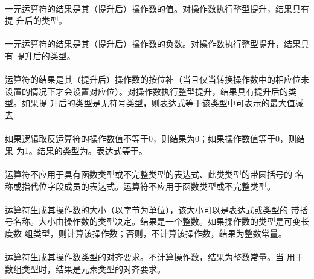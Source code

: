 {\semantic
\paragraph{}
一元\tm{+}运算符的结果是其（提升后）操作数的值。对操作数执行整型提升，结果具有提
升后的类型。

\paragraph{}
一元\tm{-}运算符的结果是其（提升后）操作数的负数。对操作数执行整型提升，结果具有
提升后的类型。

\paragraph{}
\tm{\~}运算符的结果是其（提升后）操作数的按位补（当且仅当转换操作数中的相应位未
设置的情况下才会设置对应位）。对操作数执行整型提升，结果具有提升后的类型。如果提
升后的类型是无符号类型，则表达式等于该类型中可表示的最大值减去.

\paragraph{}
如果逻辑取反运算符\tm{!}的操作数值不等于0，则结果为0；如果操作数值等于0，则结果
为1。结果的类型为。表达式等于。

\constraint
\paragraph{}
运算符不应用于具有函数类型或不完整类型的表达式、此类类型的带圆括号的
名称或指代位字段成员的表达式。运算符不应用于函数类型或不完整类型。

\semantic
\paragraph{}
运算符生成其操作数的大小（以字节为单位），该大小可以是表达式或类型的
带括号名称。大小由操作数的类型决定。结果是一个整数。如果操作数的类型是可变长度数
组类型，则计算该操作数；否则，不计算该操作数，结果为整数常量。

\paragraph{}
运算符生成其操作数类型的对齐要求。不计算操作数，结果为整数常量。当
用于数组类型时，结果是元素类型的对齐要求。

}
